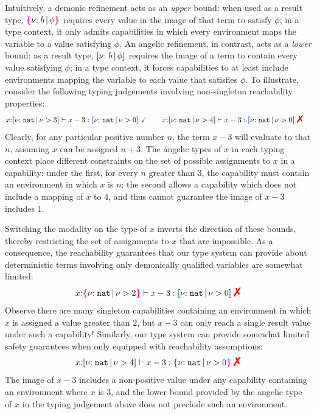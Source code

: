 Intuitively, a demonic refinement acts as an \emph{upper} bound: when
used as a result type, $\textcolor{magenta}{\mbox{\rm\textbf{\{}}} { {\nu}{:}\;{b}\, |\, {\phi} } \textcolor{magenta}{\mbox{\rm\textbf{\}}}}$ requires every value in the
image of that term to satisfy $\phi$; in a type context, it only
admits capabilities in which every environment maps the variable to a
value satisfying $\phi$. An angelic refinement, in contrast, acts as a
\emph{lower} bound: as a result type, $\urt{b}{\phi}$ requires the
image of a term to contain every value satisfying $\phi$; in a type
context, it forces capabilities to at least include environments
mapping the variable to each value that satisfies $\phi$. To
illustrate, %
consider the following typing judgements involving non-singleton
reachability properties: %
\vspace{-0.2em}
\begin{align*}
  x{:}\urt{\Nat}{\vnu > 3} \vdash x - 3 : \urt{\Nat}{\vnu >
  0}\;\judgok \quad & \quad
  x{:}\urt{\Nat}{\vnu > 4} \vdash x - 3 : \urt{\Nat}{\vnu > 0}\;\judgfail
\end{align*} %
\noindent
Clearly, for any particular positive number $n$, the term $x - 3$ will
evaluate to that $n$, assuming $x$ can be assigned $n + 3$.  The
angelic types of $x$ in each typing context place different
constraints on the set of possible assignments to $x$ in a capability:
under the first, for every $n$ greater than $3$, the capability must
contain an environment in which $x$ is $n$; the second allows a
capability which does not include a mapping of $x$ to $4$, and thus
cannot guarantee the image of $x - 3$ includes $1$.

Switching the modality on the type of $x$ inverts the direction of
these bounds, thereby restricting the set of assignments to $x$ that
are impossible. As a consequence, the reachability guarantees that our
type system can provide about deterministic terms involving only
demonically qualified variables are somewhat limited:
\vspace{-0.2em}
\begin{align*}
  x{:}\ort{\Nat}{\vnu > 2} \vdash x - 3 : \urt{\Nat}{\vnu > 0}\;\judgfail %
\end{align*} %
Observe there are many singleton capabilities containing an
environment in which $x$ is assigned a value greater than $2$, but
$x - 3$ can only reach a single result value under such a capability!
Similarly, our type system can provide somewhat limited safety
guarantees when only equipped with reachability assumptions:
\vspace{-0.2em}
\begin{align*}
  x{:}\urt{\Nat}{\vnu > 4} \vdash x - 3 : \ort{\Nat}{\vnu > 0}\;\judgfail
\end{align*} %
The image of $x - 3$ includes a non-positive value under any
capability containing an environment where $x$ is $3$, and the lower
bound provided by the angelic type of $x$ in the typing judgement
above does not preclude such an environment.


